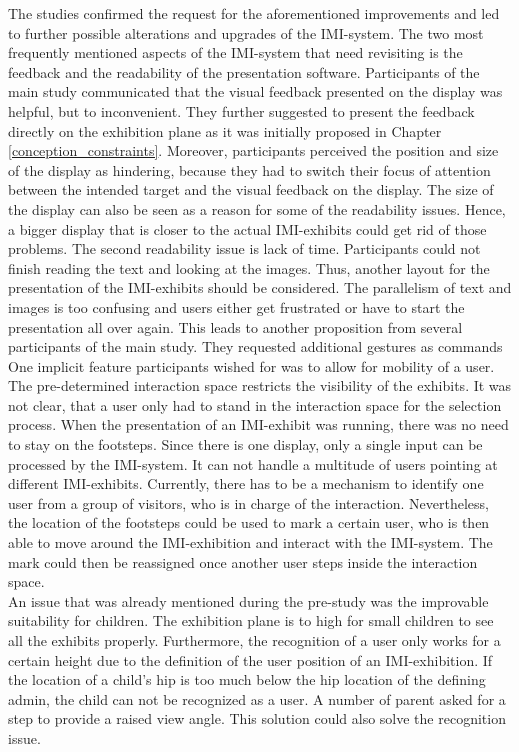 The studies confirmed the request for the aforementioned improvements and led to further possible alterations and upgrades of the \ac{IMI}-system. The two most frequently mentioned aspects of the \ac{IMI}-system that need revisiting is the feedback and the readability of the presentation software. Participants of the main study communicated that the visual feedback presented on the display was helpful, but to inconvenient. They further suggested to present the feedback directly on the exhibition plane as it was initially proposed in Chapter \ref{conception_constraints}. Moreover, participants perceived the position and size of the display as hindering, because they had to switch their focus of attention between the intended target and the visual feedback on the display. The size of the display can also be seen as a reason for some of the readability issues. Hence, a bigger display that is closer to the actual \ac{IMI}-exhibits could get rid of those problems. The second readability issue is lack of time. Participants could not finish reading the text and looking at the images. Thus, another layout for the presentation of the \ac{IMI}-exhibits should be considered. The parallelism of text and images is too confusing and users either get frustrated or have to start the presentation all over again. This leads to another proposition from several participants of the main study. They requested additional gestures as commands
\\
One implicit feature participants wished for was to allow for mobility of a user. The pre-determined interaction space restricts the visibility of the exhibits. It was not clear, that a user only had to stand in the interaction space for the selection process. When the presentation of an \ac{IMI}-exhibit was running, there was no need to stay on the footsteps. Since there is one display, only a single input can be processed by the \ac{IMI}-system. It can not handle a multitude of users pointing at different \ac{IMI}-exhibits. Currently, there has to be a mechanism to identify one user from a group of visitors, who is in charge of the interaction. Nevertheless, the location of the footsteps could be used to mark a certain user, who is then able to move around the \ac{IMI}-exhibition and interact with the \ac{IMI}-system. The mark could then be reassigned once another user steps inside the interaction space.
\\
An issue that was already mentioned during the pre-study was the improvable suitability for children. The exhibition plane is to high for small children to see all the exhibits properly. Furthermore, the recognition of a user only works for a certain height due to the definition of the user position of an \ac{IMI}-exhibition. If the location of a child's hip is too much below the hip location of the defining admin, the child can not be recognized as a user. A number of parent asked for a step to provide a raised view angle. This solution could also solve the recognition issue.

